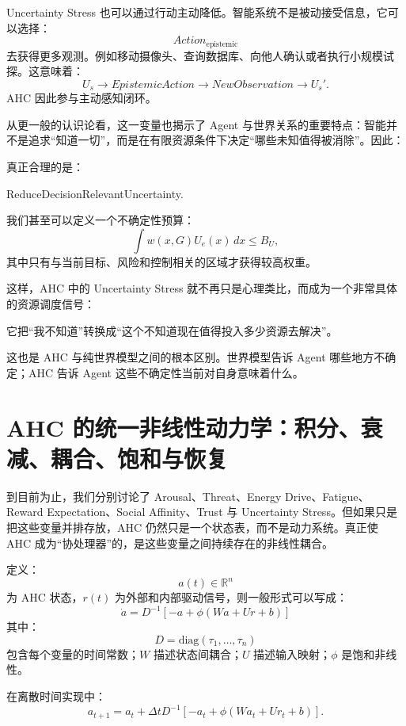 Uncertainty Stress 也可以通过行动主动降低。智能系统不是被动接受信息，它可以选择：
\[
Action_{\mathrm{epistemic}}
\]
去获得更多观测。例如移动摄像头、查询数据库、向他人确认或者执行小规模试探。这意味着：
\[
U_s
\rightarrow
EpistemicAction
\rightarrow
NewObservation
\rightarrow
U_s'.
\]
AHC 因此参与主动感知闭环。

从更一般的认识论看，这一变量也揭示了 Agent 与世界关系的重要特点：智能并不是追求“知道一切”，而是在有限资源条件下决定“哪些未知值得被消除”。因此：
\begin{statementbox}
\centering
{}
\end{statementbox}
真正合理的是：
\begin{statementbox}
ReduceDecisionRelevantUncertainty.
\end{statementbox}

我们甚至可以定义一个不确定性预算：
\[
\int
w(x,G)U_e(x)\,dx
\leq
B_U,
\]
其中只有与当前目标、风险和控制相关的区域才获得较高权重。

这样，AHC 中的 Uncertainty Stress 就不再只是心理类比，而成为一个非常具体的资源调度信号：
\begin{statementbox}
它把“我不知道”转换成“这个不知道现在值得投入多少资源去解决”。
\end{statementbox}

这也是 AHC 与纯世界模型之间的根本区别。世界模型告诉 Agent 哪些地方不确定；AHC 告诉 Agent 这些不确定性当前对自身意味着什么。

\section{AHC 的统一非线性动力学：积分、衰减、耦合、饱和与恢复}

到目前为止，我们分别讨论了 Arousal、Threat、Energy Drive、Fatigue、Reward Expectation、Social Affinity、Trust 与 Uncertainty Stress。但如果只是把这些变量并排存放，AHC 仍然只是一个状态表，而不是动力系统。真正使 AHC 成为“协处理器”的，是这些变量之间持续存在的非线性耦合。

定义：
\[
a(t)\in\mathbb R^n
\]
为 AHC 状态，\(r(t)\) 为外部和内部驱动信号，则一般形式可以写成：
\[
\boxed{
\dot a
=
D^{-1}
\left[
-a
+
\phi
(
Wa
+
Ur
+
b
)
\right]
}
\]
其中：
\[
D
=
\mathrm{diag}
(\tau_1,\ldots,\tau_n)
\]
包含每个变量的时间常数；\(W\) 描述状态间耦合；\(U\) 描述输入映射；\(\phi\) 是饱和非线性。

在离散时间实现中：
\[
a_{t+1}
=
a_t
+
\Delta t
D^{-1}
\left[
-a_t
+
\phi(Wa_t+Ur_t+b)
\right].
\]

